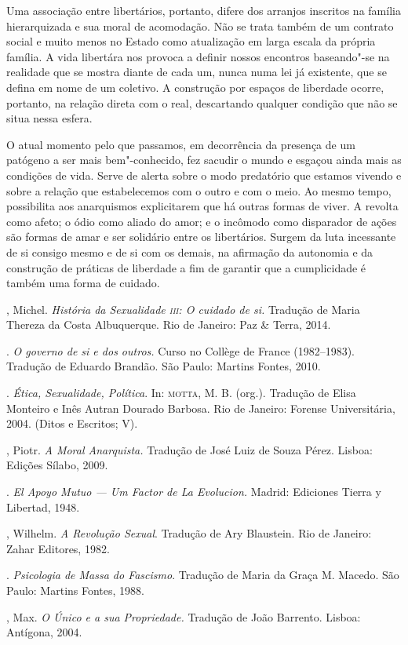 Uma associação entre libertários, portanto, difere dos arranjos
inscritos na família hierarquizada e sua moral de acomodação. Não se
trata também de um contrato social e muito menos no Estado como
atualização em larga escala da própria família. A vida libertára nos
provoca a definir nossos encontros baseando"-se na realidade que se
mostra diante de cada um, nunca numa lei já existente, que se defina em
nome de um coletivo. A construção por espaços de liberdade ocorre,
portanto, na relação direta com o real, descartando qualquer condição
que não se situa nessa esfera.

O atual momento pelo que passamos, em decorrência da presença de um
patógeno a ser mais bem"-conhecido, fez sacudir o mundo e esgaçou ainda
mais as condições de vida. Serve de alerta sobre o modo predatório que
estamos vivendo e sobre a relação que estabelecemos com o outro e com o
meio. Ao mesmo tempo, possibilita aos anarquismos explicitarem que há
outras formas de viver. A revolta como afeto; o ódio como aliado do
amor; e o incômodo como disparador de ações são formas de amar e ser
solidário entre os libertários. Surgem da luta incessante de si consigo
mesmo e de si com os demais, na afirmação da autonomia e da construção
de práticas de liberdade a fim de garantir que a cumplicidade é também
uma forma de cuidado.

\begin{bibliohedra}
, Michel. \emph{História da Sexualidade \textsc{iii}: O cuidado de si.}
Tradução de Maria Thereza da Costa Albuquerque. Rio de Janeiro: Paz \&
Terra, 2014.

\titidem. \emph{O governo de si e dos outros.} Curso no Collège de
France (1982--1983). Tradução de Eduardo Brandão. São Paulo: Martins
Fontes, 2010.

\titidem. \emph{Ética, Sexualidade, Política}. In: \textsc{motta}, M. B. (org.).
Tradução de Elisa Monteiro e Inês Autran Dourado Barbosa. Rio de
Janeiro: Forense Universitária, 2004. (Ditos e Escritos; V).

, Piotr. \emph{A Moral Anarquista.} Tradução de José Luiz de
Souza Pérez. Lisboa: Edições Sílabo, 2009.

\titidem. \emph{El Apoyo Mutuo --- Um Factor de La Evolucion.} Madrid:
Ediciones Tierra y Libertad, 1948.

, Wilhelm. \emph{A Revolução Sexual}. Tradução de Ary Blaustein.
Rio de Janeiro: Zahar Editores, 1982.

\titidem. \emph{Psicologia de Massa do Fascismo}. Tradução de Maria da
Graça M. Macedo. São Paulo: Martins Fontes, 1988.

, Max. \emph{O Único e a sua Propriedade.} Tradução de João
Barrento. Lisboa: Antígona, 2004.
\end{bibliohedra}

